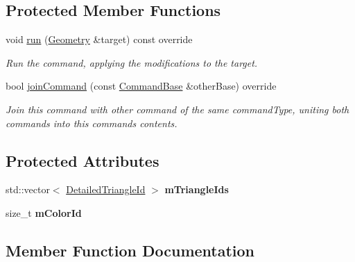 \subsection*{Protected Member Functions}
\begin{DoxyCompactItemize}
\item 
\mbox{\label{classpepr3d_1_1_cmd_paint_single_color_ab113e39f99d4763fa7a5b0d4839c06fc}} 
void \mbox{\hyperlink{classpepr3d_1_1_cmd_paint_single_color_ab113e39f99d4763fa7a5b0d4839c06fc}{run}} (\mbox{\hyperlink{classpepr3d_1_1_geometry}{Geometry}} \&target) const override
\begin{DoxyCompactList}\small\item\em Run the command, applying the modifications to the target. \end{DoxyCompactList}\item 
bool \mbox{\hyperlink{classpepr3d_1_1_cmd_paint_single_color_a99945a65b5efae3151ebdbae619f3eed}{join\+Command}} (const \mbox{\hyperlink{classpepr3d_1_1_command_base}{Command\+Base}} \&other\+Base) override
\begin{DoxyCompactList}\small\item\em Join this command with other command of the same command\+Type, uniting both commands into this command\textquotesingle{}s contents. \end{DoxyCompactList}\end{DoxyCompactItemize}
\subsection*{Protected Attributes}
\begin{DoxyCompactItemize}
\item 
\mbox{\label{classpepr3d_1_1_cmd_paint_single_color_a35c9fb01eb1b09c34441e7b77955fbe8}} 
std\+::vector$<$ \mbox{\hyperlink{structpepr3d_1_1_detailed_triangle_id}{Detailed\+Triangle\+Id}} $>$ {\bfseries m\+Triangle\+Ids}
\item 
\mbox{\label{classpepr3d_1_1_cmd_paint_single_color_ae9397951977c22f22ed343acd1316304}} 
size\+\_\+t {\bfseries m\+Color\+Id}
\end{DoxyCompactItemize}


\subsection{Member Function Documentation}
\mbox{\label{classpepr3d_1_1_cmd_paint_single_color_a99945a65b5efae3151ebdbae619f3eed}} 
